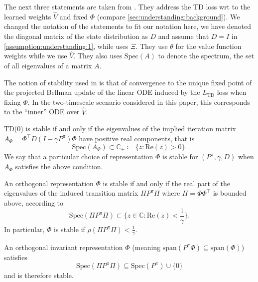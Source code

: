 The next three statements are taken from \textcite{ghosh2020representations}.  They address the TD loss wrt to the learned weights $\hat{V}$ and fixed $\Phi$ (compare \autoref{sec:understanding:background}).
We changed the notation of the statements to fit our notation here, we have denoted the diagonal matrix of the state distribution as $D$ and assume that $D=I$ in \autoref{assumption:understanding:1}, while \textcite{ghosh2020representations} uses $\Xi$. They use $\theta$ for the value function weights while we use $\hat{V}$.
They also uses $\text{Spec}(A)$ to denote the spectrum, the set of all eigenvalues of a matrix $A$.

The notion of stability used in \textcite{ghosh2020representations} is that of convergence to the unique fixed point of the projected Bellman update of the linear ODE induced by the $L_\text{TD}$ loss when fixing $\Phi$. In the two-timescale scenario considered in this paper, this corresponds to the ``inner'' ODE over $\hat{V}$.

\begin{lemma}\label{prop:understanding:gosh1}
    TD(0) is stable if and only if the eigenvalues of the implied iteration matrix $A_\Phi = \Phi^\top D (I - \gamma P^\pi) \Phi$ have positive real components, that is $$\text{Spec}\left(A_\Phi\right) \subset \mathbb{C}_+ \coloneq \{z : \text{Re}(z) > 0 \}.$$
    We say that a particular choice of representation $\Phi$ is stable for $(P^\pi, \gamma, D)$ when $A_\Phi$ satisfies the above condition.
\end{lemma}

\begin{lemma}\label{prop:understanding:gosh2}
    An orthogonal representation $\Phi$ is stable if and only if the real part of the eigenvalues of the induced transition matrix $\Pi P^\pi \Pi$ where $\Pi = \Phi\Phi^\top$ is bounded above, according to $$\text{Spec}\left(\Pi P^\pi \Pi\right) \subset \{z \in \mathbb{C}: \text{Re}(z) < \frac{1}{\gamma} \}.$$
    In particular, $\Phi$ is stable if $\rho(\Pi P^\pi\Pi) < \frac{1}{\gamma}$.
\end{lemma}

\begin{lemma}\label{prop:understanding:gosh3}
    An orthogonal invariant representation $\Phi$ (meaning $\text{span}(P^\pi \Phi) \subseteq \text{span}(\Phi)$) satisfies $$\text{Spec}\left(\Pi P^\pi \Pi\right) \subseteq \text{Spec}(P^\pi) \cup \{0\}$$ and is therefore stable.
\end{lemma}

